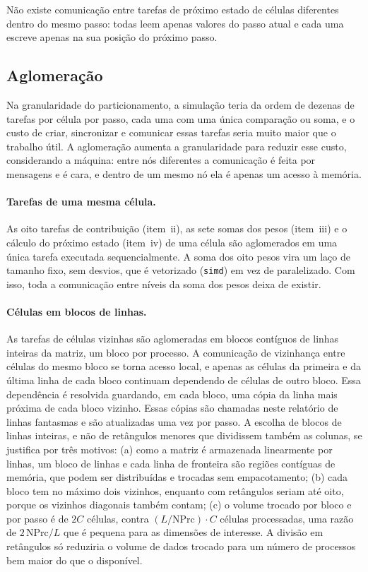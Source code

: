 \documentclass[11pt,a4paper]{article}
\begin{document}
Não existe comunicação entre tarefas de próximo estado de células diferentes dentro do mesmo passo: todas leem apenas valores do passo atual e cada uma escreve apenas na sua posição do próximo passo.

\subsection{Aglomeração}
\label{sec:aglomeracao}

Na granularidade do particionamento, a simulação teria da ordem de dezenas de tarefas por célula por passo, cada uma com uma única comparação ou soma, e o custo de criar, sincronizar e comunicar essas tarefas seria muito maior que o trabalho útil. A aglomeração aumenta a granularidade para reduzir esse custo, considerando a máquina: entre nós diferentes a comunicação é feita por mensagens e é cara, e dentro de um mesmo nó ela é apenas um acesso à memória.

\paragraph{Tarefas de uma mesma célula.} As oito tarefas de contribuição (item~ii), as sete somas dos pesos (item~iii) e o cálculo do próximo estado (item~iv) de uma célula são aglomerados em uma única tarefa executada sequencialmente. A soma dos oito pesos vira um laço de tamanho fixo, sem desvios, que é vetorizado (\texttt{simd}) em vez de paralelizado. Com isso, toda a comunicação entre níveis da soma dos pesos deixa de existir.

\paragraph{Células em blocos de linhas.} As tarefas de células vizinhas são aglomeradas em blocos contíguos de linhas inteiras da matriz, um bloco por processo. A comunicação de vizinhança entre células do mesmo bloco se torna acesso local, e apenas as células da primeira e da última linha de cada bloco continuam dependendo de células de outro bloco. Essa dependência é resolvida guardando, em cada bloco, uma cópia da linha mais próxima de cada bloco vizinho. Essas cópias são chamadas neste relatório de linhas fantasmas e são atualizadas uma vez por passo. A escolha de blocos de linhas inteiras, e não de retângulos menores que dividissem também as colunas, se justifica por três motivos: (a) como a matriz é armazenada linearmente por linhas, um bloco de linhas e cada linha de fronteira são regiões contíguas de memória, que podem ser distribuídas e trocadas sem empacotamento; (b) cada bloco tem no máximo dois vizinhos, enquanto com retângulos seriam até oito, porque os vizinhos diagonais também contam; (c) o volume trocado por bloco e por passo é de $2C$ células, contra $(L/\text{NPrc}) \cdot C$ células processadas, uma razão de $2\,\text{NPrc}/L$ que é pequena para as dimensões de interesse. A divisão em retângulos só reduziria o volume de dados trocado para um número de processos bem maior do que o disponível.
\end{document}
